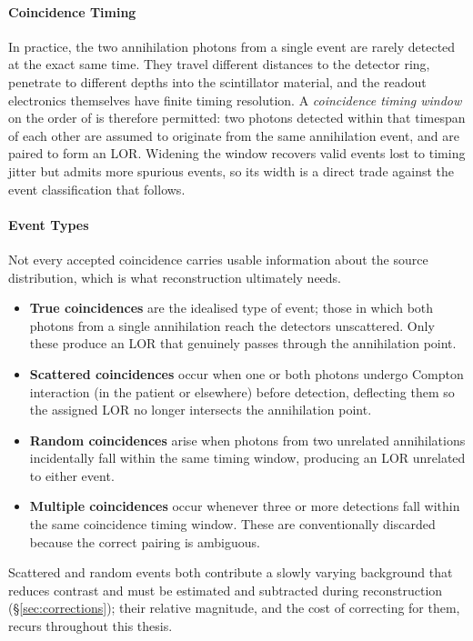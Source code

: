 \paragraph{Coincidence Timing}
In practice, the two annihilation photons from a single event are rarely detected at the exact same time.
They travel different distances to the detector ring, penetrate to different depths into the scintillator material, and the readout electronics themselves have finite timing resolution.
A \emph{coincidence timing window} on the order of  is therefore permitted: two photons detected within that timespan of each other are assumed to originate from the same annihilation event, and are paired to form an LOR.
Widening the window recovers valid events lost to timing jitter but admits more spurious events, so its width is a direct trade against the event classification that follows.

\paragraph{Event Types}
Not every accepted coincidence carries usable information about the source distribution, which is what reconstruction ultimately needs.

\begin{itemize}
	\item \textbf{True coincidences} are the idealised type of event; those in which both photons from a single annihilation reach the detectors unscattered. Only these produce an LOR that genuinely passes through the annihilation point.
	\item \textbf{Scattered coincidences} occur when one or both photons undergo Compton interaction (in the patient or elsewhere) before detection, deflecting them so the assigned LOR no longer intersects the annihilation point.
	\item \textbf{Random coincidences} arise when photons from two unrelated annihilations incidentally fall within the same timing window, producing an LOR unrelated to either event.
	\item \textbf{Multiple coincidences} occur whenever three or more detections fall within the same coincidence timing window. These are conventionally discarded because the correct pairing is ambiguous.
\end{itemize}
Scattered and random events both contribute a slowly varying background that reduces contrast and must be estimated and subtracted during reconstruction (\S\ref{sec:corrections}); their relative magnitude, and the cost of correcting for them, recurs throughout this thesis.


